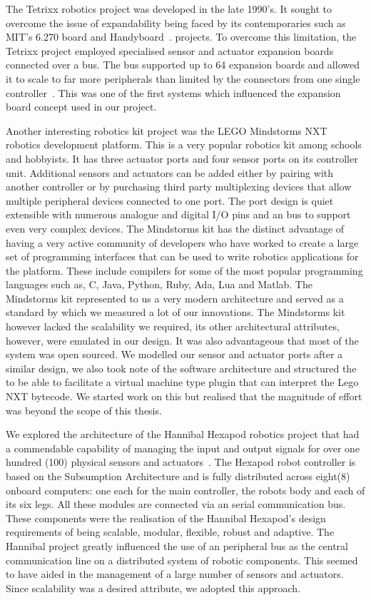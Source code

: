The Tetrixx robotics project was developed in the late 1990's. It sought to overcome the issue of expandability being faced by its contemporaries such as MIT's 6.270 board and Handyboard~\parencite{handy}. projects. To overcome this limitation, the Tetrixx project employed specialised sensor and actuator expansion boards connected over a bus. The bus supported up to 64 expansion boards and allowed it to scale to far more peripherals than limited by the connectors from one single controller~\parencite{tetrixx}. This was one of the first systems which influenced the expansion board concept used in our project.

Another interesting robotics kit project was the LEGO Mindstorms NXT robotics development platform. This is a very popular robotics kit among schools and hobbyists. It has three actuator ports and four sensor ports on its controller unit. Additional sensors and actuators can be added either by pairing with another controller or by purchasing third party multiplexing devices that allow multiple peripheral devices connected to one port. The port design is quiet extensible with numerous analogue and digital I/O pins and an \iic bus to support even very complex devices. The Mindstorms kit has the distinct advantage of having a very active community of developers who have worked to create a large set of programming interfaces that can be used to write robotics applications for the platform. These include compilers for some of the most popular programming languages such as, C, Java, Python, Ruby, Ada, Lua and Matlab. The Mindstorms kit represented to us a very modern architecture and served as a standard by which we measured a lot of our innovations. The Mindstorms kit however lacked the scalability we required, its other architectural attributes, however, were emulated in our design. It was also advantageous that most of the system was open sourced. We modelled our sensor and actuator ports after a similar design, we also took note of the software architecture and structured the \xten to be able to facilitate a virtual machine type plugin that can interpret the Lego NXT bytecode. We started work on this but realised that the magnitude of effort was beyond the scope of this thesis.

We explored the architecture of the Hannibal Hexapod robotics project that had a commendable capability of managing the input and output signals for over one hundred (100) physical sensors and actuators~\parencite{hannibal}. The Hexapod robot controller is based on the Subsumption Architecture and is fully distributed across eight(8) onboard computers: one each for the main controller, the robots body and each of its six legs. All these modules are connected via an \iic serial communication bus. These components were the realisation of the Hannibal Hexapod's design requirements of being scalable, modular, flexible, robust and adaptive. The Hannibal project greatly influenced the use of an \iic peripheral bus as the central communication line on a distributed system of robotic components. This seemed to have aided in the management of a large number of sensors and actuators. Since scalability was a desired attribute, we adopted this approach.

